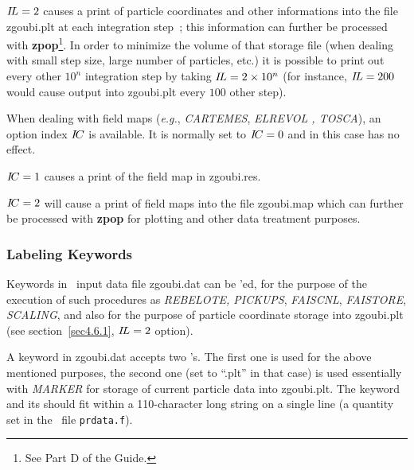 \noindent $ I\!L=2 $ causes a print   of particle coordinates and other 
informations into the file  zgoubi.plt at each integration step~; this information 
 can further be processed with 
\textbf{zpop}\footnote{See Part D of the Guide.}. In order to minimize  the volume of 
that storage file (when dealing with small step size, large number of particles, etc.) it is possible 
to print out  every other $10^n$ integration step by taking $ I\!L=2 \times 10^n $ (for instance, 
 $ I\!L=200 $ would cause output into zgoubi.plt every $100$ other step). 
\medskip

\noindent When dealing with field  maps (\emph{e.g.}, \textsl{CARTEMES}, \textsl{ELREVOL
, TOSCA}), an option index $ I\!C $ is available.
  It is normally set to $I\!C =0$ and in this case has no effect.
 
\noindent $ I\!C=1 $ causes a print of the field map in zgoubi.res. 

\noindent $ I\!C=2 $ will cause a print   of field maps into the file  zgoubi.map 
which can further be processed with \textbf{zpop} for plotting and other data treatment purposes. 


 \subsubsection{Labeling Keywords}\label{sec4.6.8}

Keywords in \zgou\ input data file zgoubi.dat can be \LABEL'ed, for the purpose of 
the execution of such procedures as  \textsl{REBELOTE,  PICKUPS}, 
\textsl{FAISCNL}, \textsl{FAISTORE}, 
 \textsl{SCALING}, and also for the purpose of 
particle coordinate storage into zgoubi.plt (see section~\ref{sec4.6.1}, 
$I\!L=2$ option). 

\medskip 

\noindent A keyword in zgoubi.dat accepts two \LABEL's. The first one is used for the 
above mentioned purposes, the second one (set to ``.plt'' in that case) is used essentially 
 with \textsl{MARKER} for storage of current particle data 
into zgoubi.plt. The keyword and its \LABEL['s] should fit within a 110-character 
long string on a single line (a quantity set in the \FORTRAN\ file \texttt{prdata.f}). 

